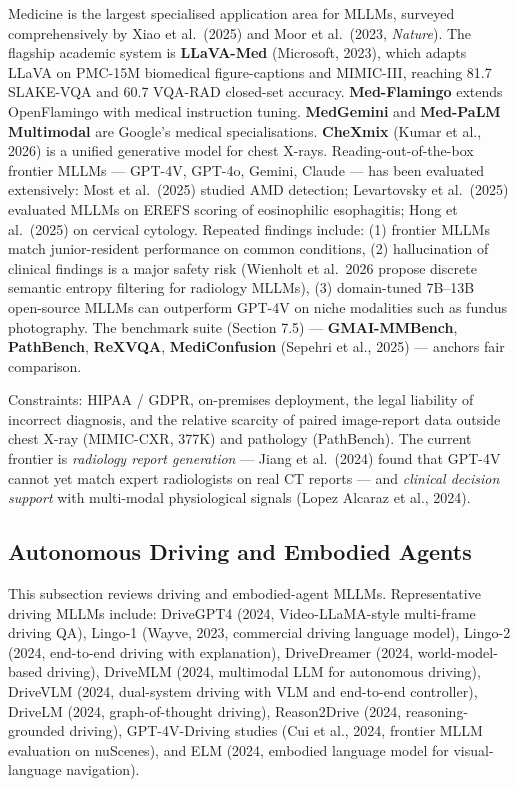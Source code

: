 \documentclass{article}
\begin{document}
Medicine is the largest specialised application area for MLLMs, surveyed comprehensively by Xiao et al.~(2025) and Moor et al.~(2023, \emph{Nature}). The flagship academic system is \textbf{LLaVA-Med} (Microsoft, 2023), which adapts LLaVA on PMC-15M biomedical figure-captions and MIMIC-III, reaching 81.7 SLAKE-VQA and 60.7 VQA-RAD closed-set accuracy. \textbf{Med-Flamingo} \citep{moor20232023} extends OpenFlamingo with medical instruction tuning. \textbf{MedGemini} \citep{saab20242024} and \textbf{Med-PaLM Multimodal} are Google's medical specialisations. \textbf{CheXmix} (Kumar et al., 2026) is a unified generative model for chest X-rays. Reading-out-of-the-box frontier MLLMs --- GPT-4V, GPT-4o, Gemini, Claude --- has been evaluated extensively: Most et al.~(2025) studied AMD detection; Levartovsky et al.~(2025) evaluated MLLMs on EREFS scoring of eosinophilic esophagitis; Hong et al.~(2025) on cervical cytology. Repeated findings include: (1) frontier MLLMs match junior-resident performance on common conditions, (2) hallucination of clinical findings is a major safety risk (Wienholt et al.~2026 propose discrete semantic entropy filtering for radiology MLLMs), (3) domain-tuned 7B--13B open-source MLLMs can outperform GPT-4V on niche modalities such as fundus photography. The benchmark suite (Section 7.5) --- \textbf{GMAI-MMBench}, \textbf{PathBench}, \textbf{ReXVQA}, \textbf{MediConfusion} (Sepehri et al., 2025) --- anchors fair comparison.

Constraints: HIPAA / GDPR, on-premises deployment, the legal liability of incorrect diagnosis, and the relative scarcity of paired image-report data outside chest X-ray (MIMIC-CXR, 377K) and pathology (PathBench). The current frontier is \emph{radiology report generation} --- Jiang et al.~(2024) found that GPT-4V cannot yet match expert radiologists on real CT reports --- and \emph{clinical decision support} with multi-modal physiological signals (Lopez Alcaraz et al., 2024).

\subsection{Autonomous Driving and Embodied Agents}\label{autonomous-driving-and-embodied-agents}

This subsection reviews driving and embodied-agent MLLMs. Representative driving MLLMs include: DriveGPT4 (2024, Video-LLaMA-style multi-frame driving QA), Lingo-1 (Wayve, 2023, commercial driving language model), Lingo-2 (2024, end-to-end driving with explanation), DriveDreamer (2024, world-model-based driving), DriveMLM (2024, multimodal LLM for autonomous driving), DriveVLM (2024, dual-system driving with VLM and end-to-end controller), DriveLM (2024, graph-of-thought driving), Reason2Drive (2024, reasoning-grounded driving), GPT-4V-Driving studies (Cui et al., 2024, frontier MLLM evaluation on nuScenes), and ELM (2024, embodied language model for visual-language navigation).
\end{document}
